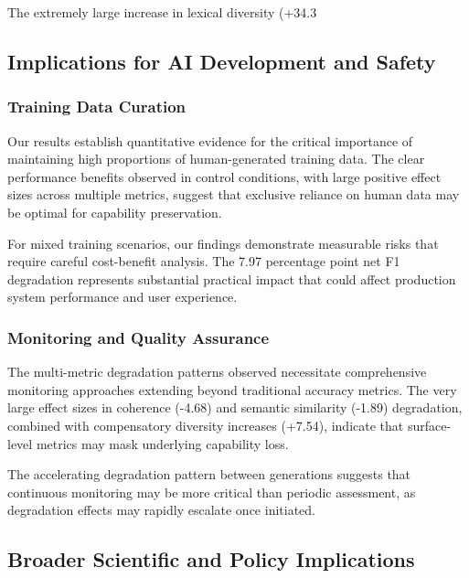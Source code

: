 \documentclass[11pt]{article}
\begin{document}
The extremely large increase in lexical diversity (+34.3%

\subsection{Implications for AI Development and Safety}

\subsubsection{Training Data Curation}

Our results establish quantitative evidence for the critical importance of maintaining high proportions of human-generated training data. The clear performance benefits observed in control conditions, with large positive effect sizes across multiple metrics, suggest that exclusive reliance on human data may be optimal for capability preservation.

For mixed training scenarios, our findings demonstrate measurable risks that require careful cost-benefit analysis. The 7.97 percentage point net F1 degradation represents substantial practical impact that could affect production system performance and user experience.

\subsubsection{Monitoring and Quality Assurance}

The multi-metric degradation patterns observed necessitate comprehensive monitoring approaches extending beyond traditional accuracy metrics. The very large effect sizes in coherence (-4.68) and semantic similarity (-1.89) degradation, combined with compensatory diversity increases (+7.54), indicate that surface-level metrics may mask underlying capability loss.

The accelerating degradation pattern between generations suggests that continuous monitoring may be more critical than periodic assessment, as degradation effects may rapidly escalate once initiated.

\subsection{Broader Scientific and Policy Implications}
\end{document}
